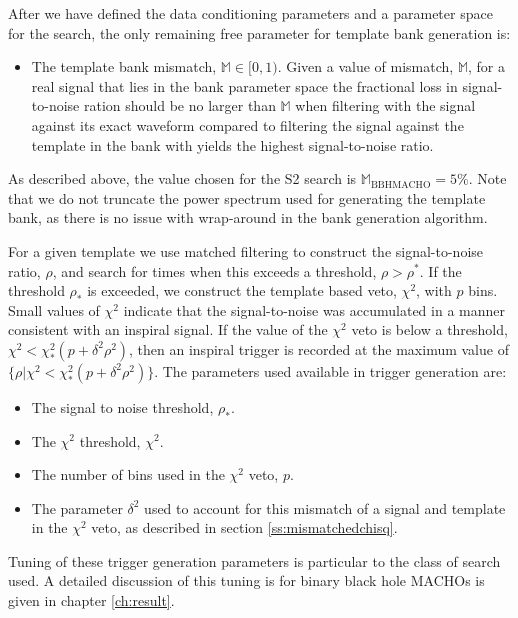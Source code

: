 After we have defined the data conditioning parameters and a parameter space
for the search, the only remaining free parameter for template bank generation
is:
\begin{itemize}
\item The template bank mismatch, $\mathbb{M} \in [0,1)$. Given a value of
mismatch, $\mathbb{M}$, for a real signal that lies in the bank parameter
space the fractional loss in signal-to-noise ration should be no larger than
$\mathbb{M}$ when filtering with the signal against its exact waveform
compared to filtering the signal against the template in the bank with yields
the highest signal-to-noise ratio.
\end{itemize}
As described above, the value chosen for the S2 search is
$\mathbb{M}_\mathrm{BBHMACHO} = 5\%$.
Note that we do not truncate the power spectrum used for generating the
template bank, as there is no issue with wrap-around in the bank generation
algorithm.

For a given template we use matched filtering to construct the signal-to-noise
ratio, $\rho$, and search for times when this exceeds a threshold, $\rho >
\rho^\ast$. If the threshold $\rho_\ast$ is exceeded, we construct the
template based veto, $\chi^2$, with $p$ bins. Small values of $\chi^2$
indicate that the signal-to-noise was accumulated in a manner consistent with
an inspiral signal. If the value of the $\chi^2$ veto is below a threshold,
$\chi^2 < \chi^2_\ast (p + \delta^2 \rho^2)$, then an inspiral trigger is
recorded at the maximum value of $\{\rho| \chi^2 < \chi^2_\ast (p + \delta^2
\rho^2)\}$.  The parameters used available in trigger generation are:
\begin{itemize}
\item The signal to noise threshold, $\rho_\ast$.

\item The $\chi^2$ threshold, $\chi^2$.

\item The number of bins used in the $\chi^2$ veto, $p$.

\item The parameter $\delta^2$ used to account for this mismatch of a signal
and template in the $\chi^2$ veto, as described in section
\ref{ss:mismatchedchisq}.
\end{itemize}
Tuning of these trigger generation parameters is particular to the class of
search used. A detailed discussion of this tuning is for binary
black hole MACHOs is given in chapter \ref{ch:result}.

